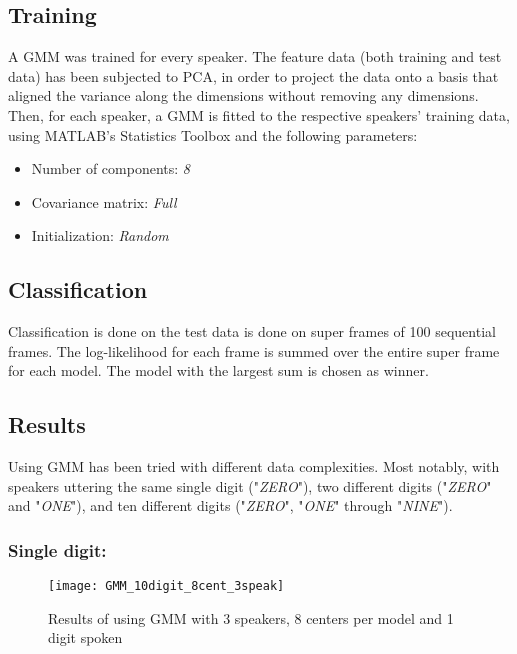 \subsection{Training}
A GMM was trained for every speaker.
The feature data (both training and test data) has been subjected to PCA, in order to project the data onto a basis that aligned the variance along the dimensions without removing any dimensions. 
Then, for each speaker, a GMM is fitted to the respective speakers' training data, using MATLAB's Statistics Toolbox and the following parameters:

\begin{itemize}

\item
Number of components: \textit{8}

\item
Covariance matrix: \textit{Full}

\item
Initialization: \textit{Random}

\end{itemize}

\subsection{Classification}
Classification is done on the test data is done on super frames of 100 sequential frames.
The log-likelihood for each frame is summed over the entire super frame for each model.
The model with the largest sum is chosen as winner.



\subsection{Results}
Using GMM has been tried with different data complexities.
Most notably, with speakers uttering the same single digit ("\textit{ZERO}"), two different digits ("\textit{ZERO}" and "\textit{ONE}"), and ten different digits ("\textit{ZERO}", "\textit{ONE}" through "\textit{NINE}").

\subsubsection{Single digit:}

\begin{figure}[H]
\centering
\texttt{[image: GMM\_10digit\_8cent\_3speak]}
\caption{Results of using GMM with 3 speakers, 8 centers per model and 1 digit spoken}
\label{fig:GMM_fig_1}
\end{figure}

